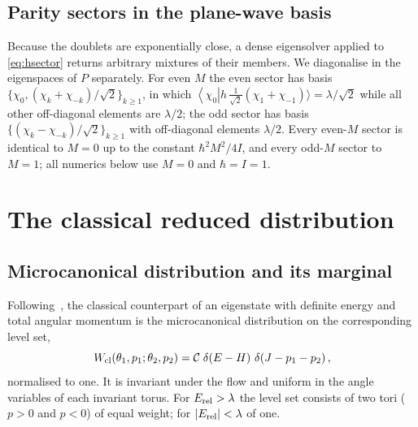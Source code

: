 \documentclass[preprint,12pt]{elsarticle}
\newcommand{\bra}[1]{\left\langle#1\right|}
\newcommand{\Erel}{E_{\rm rel}}
\begin{document}
\subsection{Parity sectors in the plane-wave basis}
\label{sec:parity}

Because the doublets are exponentially close, a dense eigensolver applied to
\eqref{eq:hsector} returns arbitrary mixtures of their members. We diagonalise
in the eigenspaces of $P$ separately. For even $M$ the even sector has basis
$\{\chi_{0},(\chi_{k}+\chi_{-k})/\sqrt2\}_{k\ge1}$, in which
$\bra{\chi_{0}}h\,\tfrac{1}{\sqrt2}(\chi_{1}+\chi_{-1})\rangle=\lambda/\sqrt2$
while all other off-diagonal elements are $\lambda/2$; the odd sector has basis
$\{(\chi_{k}-\chi_{-k})/\sqrt2\}_{k\ge1}$ with off-diagonal elements
$\lambda/2$. Every even-$M$ sector is identical to $M=0$ up to the constant
$\hbar^{2}M^{2}/4I$, and every odd-$M$ sector to $M=1$; all numerics below use
$M=0$ and $\hbar=I=1$.

\section{The classical reduced distribution}
\label{sec:classical}

\subsection{Microcanonical distribution and its marginal}

Following~\cite{DKS}, the classical counterpart of an eigenstate with definite
energy and total angular momentum is the microcanonical distribution on the
corresponding level set,
\begin{equation}
W_{\rm cl}(\theta_{1},p_{1};\theta_{2},p_{2})=\mathcal{C}\;
\delta\!\left(E-H\right)\,\delta\!\left(J-p_{1}-p_{2}\right),
\label{eq:Wjoint}
\end{equation}
normalised to one. It is invariant under the flow and uniform in the angle
variables of each invariant torus. For $\Erel>\lambda$ the level set consists of
two tori ($p>0$ and $p<0$) of equal weight; for $|\Erel|<\lambda$ of one.
\end{document}
